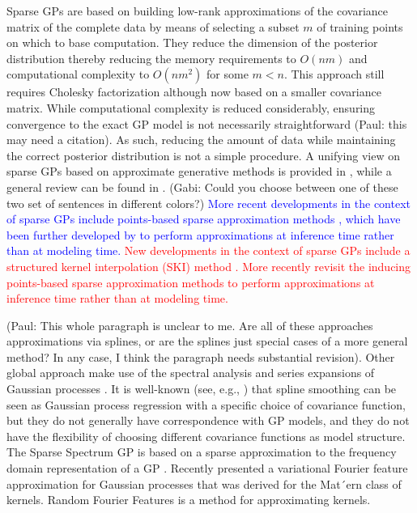 \documentclass[]{interact}
\theoremstyle{plain}%
\theoremstyle{definition}
\theoremstyle{remark}
\begin{document}
Sparse GPs are based on building low-rank approximations of the covariance matrix of the complete data by means of selecting a subset $m$ of training points on which to base computation. They reduce the dimension of the posterior distribution thereby reducing the memory requirements to $O(nm)$ and computational complexity to $O(nm^2)$ for some $m < n$. This approach still requires Cholesky factorization although now based on a smaller covariance matrix. While computational complexity is reduced considerably, ensuring convergence to the exact GP model is not necessarily straightforward (Paul: this may need a citation). As such, reducing the amount of data while maintaining the correct posterior distribution is not a simple procedure. A unifying view on sparse GPs based on approximate generative methods is provided in \cite{quinonero2005unifying}, while a general review can be found in \cite{rasmussen2006gaussian}. (Gabi: Could you choose between one of these two set of sentences in different colors?) \textcolor{blue}{More recent developments in the context of sparse GPs include points-based sparse approximation methods \citep{wilson2015kernel}, which have been further developed by \citep{bui2017unifying} to perform approximations at inference time rather than at modeling time.} \textcolor{red} {New developments in the context of sparse GPs include a structured kernel interpolation (SKI) method \citep{wilson2015kernel}. More recently \citep{bui2017unifying} revisit the inducing points-based sparse approximation methods to perform approximations at inference time rather than at modeling time.}

(Paul: This whole paragraph is unclear to me. Are all of these approaches approximations via splines, or are the splines just special cases of a more general method? In any case, I think the paragraph needs substantial revision). Other global approach make use of the spectral analysis and series expansions of Gaussian processes \citep{loeve1977probability,trees1968detection,adler1981geometry,cramer2013stationary}. It is well-known (see, e.g., \cite{wahba1990spline}) that spline smoothing can be seen as Gaussian process regression with a specific choice of covariance function, but they do not generally have correspondence with GP models, and they do not have the flexibility of choosing different covariance functions as model structure. The Sparse Spectrum GP is based on a sparse approximation to the frequency domain representation of a GP \citep{lazaro2010sparse,quia2010sparse,gal2015improving,gal2015improving}. Recently \citep{hensman2017variational} presented a variational Fourier feature approximation for Gaussian processes that was derived for the Mat´ern class of kernels. Random Fourier Features \citep{rahimi2008random,rahimi2009weighted} is a method for approximating kernels.
\end{document}
